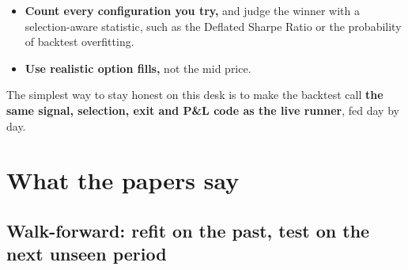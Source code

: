 \documentclass{article}
\begin{document}
\begin{itemize}

\item \textbf{Count every configuration you try,} and judge the winner with a selection-aware statistic, such as the Deflated Sharpe Ratio or the probability of backtest overfitting.

\item \textbf{Use realistic option fills,} not the mid price.

\end{itemize}

The simplest way to stay honest on this desk is to make the backtest call \textbf{the same signal, selection, exit and P\&L code as the live runner}, fed day by day.

\section{What the papers say}

\subsection{Walk-forward: refit on the past, test on the next unseen period}
\end{document}
